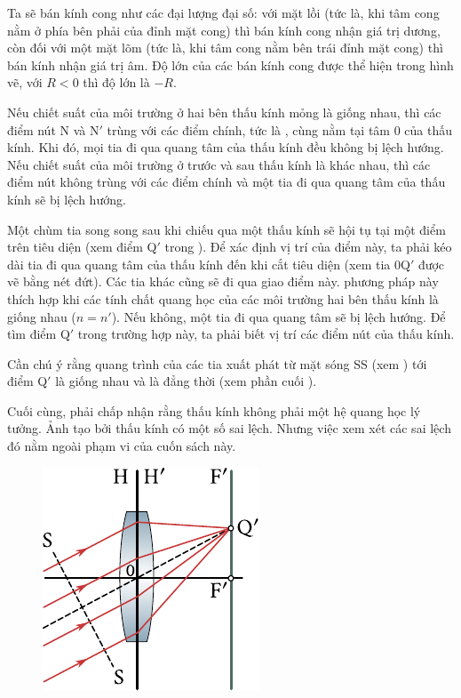 Ta sẽ bán kính cong như các đại lượng đại số: với mặt lồi (tức là, khi tâm cong nằm ở phía bên phải của đỉnh mặt cong) thì bán kính cong nhận giá trị dương, còn đối với một mặt lõm (tức là, khi tâm cong nằm bên trái đỉnh mặt cong) thì bán kính nhận giá trị âm.
Độ lớn của các bán kính cong được thể hiện trong hình vẽ, với $R < 0$ thì độ lớn là $-R$.

Nếu chiết suất của môi trường ở hai bên thấu kính mỏng là giống nhau, thì các điểm nút N và N$'$ trùng với các điểm chính, tức là , cùng nằm tại tâm $0$ của thấu kính.
Khi đó, mọi tia đi qua quang tâm của thấu kính đều không bị lệch hướng.
Nếu chiết suất của môi trường ở trước và sau thấu kính là khác nhau, thì các điểm nút không trùng với các điểm chính và một tia đi qua quang tâm của thấu kính sẽ bị lệch hướng.

Một chùm tia song song sau khi chiếu qua một thấu kính sẽ hội tụ tại một điểm trên tiêu diện (xem điểm Q$'$ trong ).
Để xác định vị trí của điểm này, ta phải kéo dài tia đi qua quang tâm của thấu kính đến khi cắt tiêu diện (xem tia $0$Q$'$ được vẽ bằng nét đứt).
Các tia khác cũng sẽ đi qua giao điểm này.
phương pháp này thích hợp khi các tính chất quang học của các môi trường hai bên thấu kính là giống nhau ($n=n'$).
Nếu không, một tia đi qua quang tâm sẽ bị lệch hướng.
Để tìm điểm Q$'$ trong trường hợp này, ta phải biết vị trí các điểm nút của thấu kính.

Cần chú ý rằng quang trình của các tia xuất phát từ mặt sóng SS (xem ) tới điểm Q$'$
là giống nhau và là đẳng thời (xem phần cuối ).

Cuối cùng, phải chấp nhận rằng thấu kính không phải một hệ quang học lý tưởng.
Ảnh tạo bởi thấu kính có một số sai lệch.
Nhưng việc xem xét các sai lệch đó nằm ngoài phạm vi của cuốn sách này.

\begin{figure}[!htb]
	\begin{center}
		\includegraphics[scale=1]{figures/ch_16/fig_16_20.pdf}
        \caption[]{}
		\label{fig:16_20}
	\end{center}
	\vspace{-0.8cm}
\end{figure}

